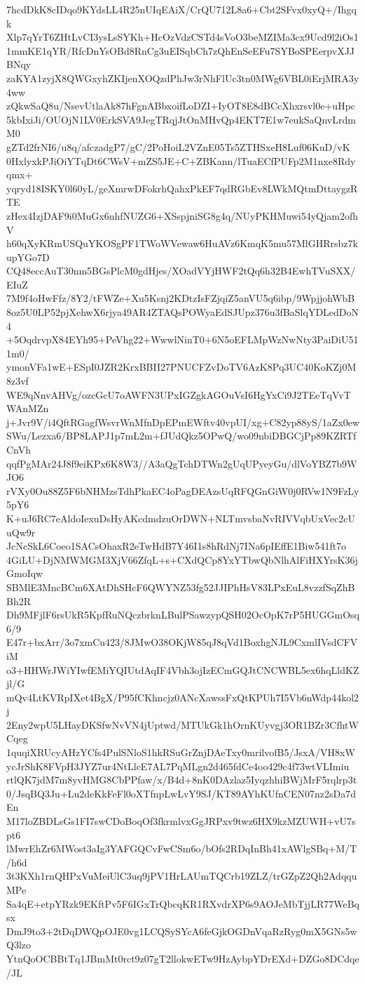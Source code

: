 7hcdDkK8cIDqo9KYdsLL4R25nUIqEAiX/CrQU712L8a6+Cbt2SFvx0xyQ+/Ihgqk
Xlp7qYrT6ZHtLvCI3ysLsSYKh+HcOzVdzCSTd4sVoO3beMZIMa3cx9Ucd9l2iOs1
1mmKE1qYR/RfcDnYsOBd8RnCg3uEISqbCh7zQhEnSeEFu7SYBoSPEerpvXJJBNqy
zaKYA1zyjX8QWGxyhZKIjenXOQzdPhJw3rNhFlUc3tn0MWg6VBL0iErjMRA3y4ww
zQkwSaQ8u/NsevUtlaAk87hFgnABbxoifLoDZI+IyOT8E8dBCcXhxrsvl0e+uHpc
5kbIxiJi/OUOjN1LV0ErkSVA9JegTRqjJtOnMHvQp4EKT7E1w7eukSaQnvLrdmM0
gZTd2frNI6/u8q/afczadgP7/gC/2PoHoiL2VZnE05Ts5ZTHSxeH8Luf06KuD/vK
0HxlyxkPJiOiYTqDt6CWsV+mZS5JE+C+ZBKann/lTuaECfPUFp2M1nxe8Rdyqmx+
yqryd18ISKY0l60yL/geXmrwDFokrhQahxPkEF7qdRGbEv8LWkMQtmDttaygzRTE
zHex4IzjDAF9i0MuGx6nhfNUZG6+XSspjniSG8g4q/NUyPKHMuwi54yQjam2ofhV
h60qXyKRmUSQuYKOSgPF1TWoWVewaw6HuAVz6KmqK5mu57MlGHRrsbz7kupYGo7D
CQ48eccAuT30nm5BGsPlcM0gdHjes/XOadVYjHWF2tQq6h32B4EwhTVuSXX/EIuZ
7M9f4oHwFfz/8Y2/tFWZe+Xu5Ksnj2KDtzIsFZjqiZ5anVU5q6ibp/9WpjjohWbB
8oz5U0LP52pjXehwX6rjya49AR4ZTAQsPOWyaEdSJUpz376u3fBaSlqYDLedDoN4
+5OqdrvpX84EYh95+PeVhg22+WwwlNinT0+6N5oEFLMpWzNwNty3PaiDiU511m0/
ymonVFa1wE+ESpI0JZR2KrxBBII27PNUCFZvDoTV6AzK8Pq3UC40KoKZj0M8z3vf
WE9qNnvAHVg/ozcGcU7oAWFN3UPxIGZgkAGOuVsI6HgYxCi9J2TEeTqVvTWAnMZn
j+Jvr9V/i4QftRGagfWsvrWnMfnDpEPmEWftv40vpUI/xg+C82yp88yS/1aZx0ew
SWu/Lezxa6/BP8LAPJ1p7mL2m+fJUdQkz5OPwQ/wo09nbiDBGCjPp89KZRTfCnVh
qqfPgMAr24J8f9eiKPx6K8W3//A3aQgTchDTWn2gUqUPyeyGu/dlVoYBZ7b9WJO6
rVXy0Ou88Z5F6bNHMzsTdhPkaEC4oPagDEAzsUqRFQGnGiW0j0RVw1N9FzLy5pY6
K+uJ6RC7eAldoIexuDsHyAKcdmdzuOrDWN+NLTmvsbaNvRIVVqbUxVec2cUuQw9r
JcNcSkL6Coeo1SACsOhaxR2eTwHdB7Y46I1s8hRdNj7INa6pIEffE1Biw541ft7o
4GiLU+DjNMWMGM3XjV66ZfqL+s+CXdQCp8YxYTbwQbNlhAlFiHXYrsK36jGmoIqw
SBMlE3MncBCm6XAtDhSHcF6QWYNZ53fg52JJIPhHsV83LPxEuL8vzzfSqZhBBh2R
Dh9MFjlF6rsUkR5KpfRuNQczbrknLBulPSawzypQSH02OcOpK7rP5HUGGmOsq6/9
E47r+bxArr/3o7xmCu423/8JMwO38OKjW85qJ8qVd1BoxhgNJL9CxmlIVsdCFViM
o3+HHWrJWiYIwfEMiYQIUtdAqIF4Vbh3ojIzECmGQJtCNCWBL5ex6hqLldKZjl/G
mQv4LtKVRpIXet4BgX/P95fCKhncjz0ANcXawssFxQtKPUh7I5Vb6nWdp44kol2j
2Eny2wpU5LHayDKSfwNvVN4jUptwd/MTUkGk1hOrnKUyvgj3OR1BZr3CfhtWCqeg
1quqiXRUcyAHzYCfs4PulSNloS1hkRSuGrZnjDAeTxy0mrilvofB5/JsxA/VH8xW
ycJrShK8FVpH3JYZ7ur4NtLlcE7AL7PqMLgn2d465fdCe4oo429c4f73wtVLImiu
rtlQK7jdM7m8yvHMG8CbPPfaw/x/B4d+8nK0DAzlaz5IyqzhhiBWjMrF5rqlrp3t
0/JsqBQ3Ju+Lu2deKkFeFl0oXTfnpLwLvY9SJ/KT89AYhKUfnCEN07nz2sDa7dEn
M17loZBDLsGs1FI7swCDoBoqOf3fkrmlvxGgJRPxv9twz6HX9kzMZUWH+vU7spt6
lMwrEhZr6MWost3aIg3YAFGQCvFwCSm6o/bOfs2RDqInBh41xAWlgSBq+M/T/h6d
3t3KXh1rnQHPxVuMeiUlC3uq9jPV1HrLAUmTQCrb19ZLZ/trGZpZ2Qh2AdqquMPe
Sa4qE+etpYRzk9EKftPv5F6IGxTrQbcqKR1RXvdrXP6s9AOJeMbTjjLR77WeBqsx
DmJ9to3+2tDqDWQpOJE0vg1LCQSySYcA6feGjkOGDnVqaRzRyg0mX5GNs5wQ3lzo
YtnQoOCBBtTq1JBmMt0rct9z07gT2llokwETw9HzAybpYDrEXd+DZGo8DCdqe/JL
